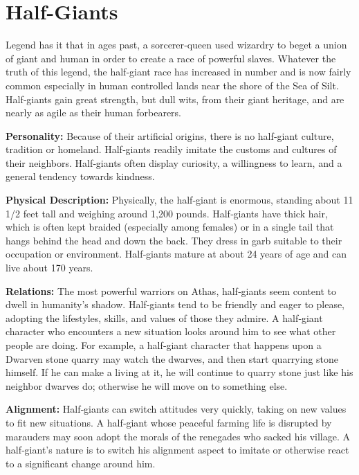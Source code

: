 \section{Half-Giants}

Legend has it that in ages past, a sorcerer‐queen used wizardry to beget a union of giant and human in order to create a race of powerful slaves. Whatever the truth of this legend, the half‐giant race has increased in number and is now fairly common especially in human controlled lands near the shore of the Sea of Silt. Half‐giants gain great strength, but dull wits, from their giant heritage, and are nearly as agile as their human forbearers.

\textbf{Personality:} Because of their artificial origins, there is no half‐giant culture, tradition or homeland. Half‐giants readily imitate the customs and cultures of their neighbors. Half‐giants often display curiosity, a willingness to learn, and a general tendency towards kindness.

\textbf{Physical Description:} Physically, the half‐giant is enormous, standing about 11 1/2 feet tall and weighing around 1,200 pounds. Half‐giants have thick hair, which is often kept braided (especially among females) or in a single tail that hangs behind the head and down the back. They dress in garb suitable to their occupation or environment. Half‐giants mature at about 24 years of age and can live about 170 years.

\textbf{Relations:} The most powerful warriors on Athas, half‐giants seem content to dwell in humanity's shadow. Half‐giants tend to be friendly and eager to please, adopting the lifestyles, skills, and values of those they admire. A half‐giant character who encounters a new situation looks around him to see what other people are doing. For example, a half‐giant character that happens upon a Dwarven stone quarry may watch the dwarves, and then start quarrying stone himself. If he can make a living at it, he will continue to quarry stone just like his neighbor dwarves do; otherwise he will move on to something else.

\textbf{Alignment:} Half‐giants can switch attitudes very quickly, taking on new values to fit new situations. A half‐giant whose peaceful farming life is disrupted by marauders may soon adopt the morals of the renegades who sacked his village. A half‐giant's nature is to switch his alignment aspect to imitate or otherwise react to a significant change around him.

